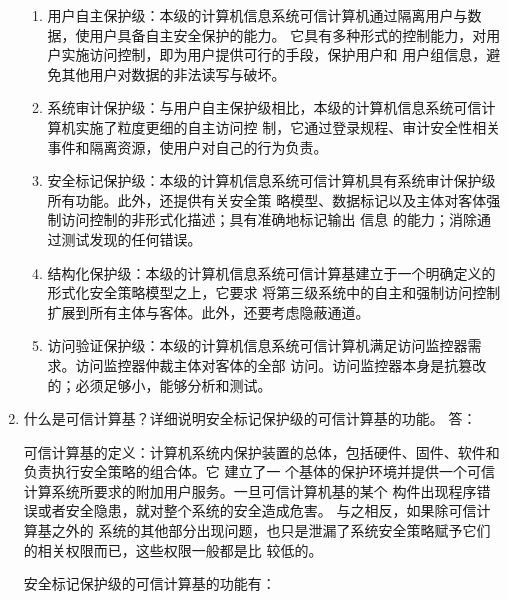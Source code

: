 \documentclass[degree=project,degree-type=project,cjk-font=noto]{thuthesis}
\begin{document}
\begin{enumerate}
\begin{enumerate}
\item 用户自主保护级：本级的计算机信息系统可信计算机通过隔离用户与数据，使用户具备自主安全保护的能力。
它具有多种形式的控制能力，对用户实施访问控制，即为用户提供可行的手段，保护用户和
用户组信息，避免其他用户对数据的非法读写与破坏。
\item 系统审计保护级：与用户自主保护级相比，本级的计算机信息系统可信计算机实施了粒度更细的自主访问控
制，它通过登录规程、审计安全性相关事件和隔离资源，使用户对自己的行为负责。
\item 安全标记保护级：本级的计算机信息系统可信计算机具有系统审计保护级所有功能。此外，还提供有关安全策
略模型、数据标记以及主体对客体强制访问控制的非形式化描述；具有准确地标记输出 信息
的能力；消除通过测试发现的任何错误。
\item 结构化保护级：本级的计算机信息系统可信计算基建立于一个明确定义的形式化安全策略模型之上，它要求
将第三级系统中的自主和强制访问控制扩展到所有主体与客体。此外，还要考虑隐蔽通道。
\item 访问验证保护级：本级的计算机信息系统可信计算机满足访问监控器需求。访问监控器仲裁主体对客体的全部
访问。访问监控器本身是抗篡改的；必须足够小，能够分析和测试。
\end{enumerate}

\item 什么是可信计算基？详细说明安全标记保护级的可信计算基的功能。
\newline
{\heiti 答：}
\newline

可信计算基的定义：计算机系统内保护装置的总体，包括硬件、固件、软件和负责执行安全策略的组合体。它
建立了一 个基体的保护环境并提供一个可信计算系统所要求的附加用户服务。一旦可信计算机基的某个
构件出现程序错误或者安全隐患，就对整个系统的安全造成危害。 与之相反，如果除可信计算基之外的
系统的其他部分出现问题，也只是泄漏了系统安全策略赋予它们的相关权限而已，这些权限一般都是比
较低的。

安全标记保护级的可信计算基的功能有：


\end{enumerate}
\end{document}
